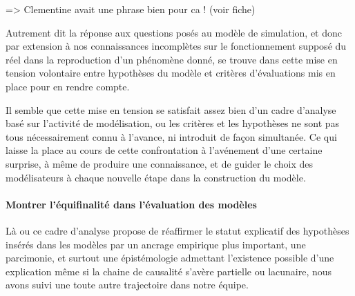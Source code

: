 => Clementine avait une phrase bien pour ca ! (voir fiche)


Autrement dit la réponse aux questions posés au modèle de simulation, et donc par extension à nos connaissances incomplètes sur le fonctionnement supposé du réel dans la reproduction d'un phénomène donné, se trouve dans cette mise en tension volontaire entre hypothèses du modèle et critères d'évaluations mis en place pour en rendre compte.

Il semble que cette mise en tension se satisfait assez bien d'un cadre d'analyse basé sur l'activité de modélisation, ou les critères et les hypothèses ne sont pas tous nécessairement connu à l'avance, ni introduit de façon simultanée. Ce qui laisse la place au cours de cette confrontation à l'avénement d'une certaine surprise, à même de produire une connaissance, et de guider le choix des modélisateurs à chaque nouvelle étape dans la construction du modèle. 















\paragraph{Montrer l'équifinalité dans l'évaluation des modèles}

Là ou ce cadre d'analyse propose de réaffirmer le statut explicatif des hypothèses insérés dans les modèles par un ancrage empirique plus important, une parcimonie, et surtout une épistémologie admettant l'existence possible d'une explication même si la chaine de causalité s'avère partielle ou lacunaire, nous avons suivi une toute autre trajectoire dans notre équipe.

